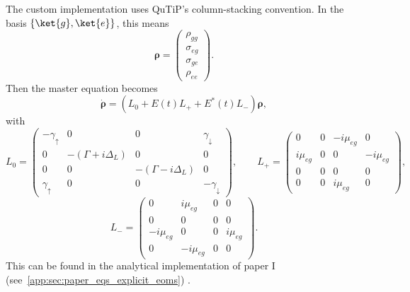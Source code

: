 The custom implementation uses QuTiP's column-stacking convention.
In the basis \(\{\ket{g}, \ket{e}\}\), this means
\begin{equation}
	\boldsymbol{\rho} =
	\begin{pmatrix}
		\rho_{gg} \\
		\sigma_{eg} \\
		\sigma_{ge} \\
		\rho_{ee}
	\end{pmatrix}.
	\label{eq:oqs_DensityMatrixVector}
\end{equation}
Then the master equation becomes
\begin{equation}
	\dot{\boldsymbol{\rho}} = \left(L_0 + E(t)L_+ + E^*(t)L_-\right)\boldsymbol{\rho},
	\label{eq:LiouvillianMatrixForm}
\end{equation}
with
\begin{equation}
	L_0 =
	\begin{pmatrix}
		-\gamma_{\uparrow} & 0 & 0 & \gamma_{\downarrow} \\
		0 & -(\Gamma + i\Delta_L) & 0 & 0 \\
		0 & 0 & -(\Gamma - i\Delta_L) & 0 \\
		\gamma_{\uparrow} & 0 & 0 & -\gamma_{\downarrow}
	\end{pmatrix},
	\qquad
	L_+ =
	\begin{pmatrix}
		0 & 0 & -i\mu_{eg} & 0 \\
		i\mu_{eg} & 0 & 0 & -i\mu_{eg} \\
		0 & 0 & 0 & 0 \\
		0 & 0 & i\mu_{eg} & 0
	\end{pmatrix},
\end{equation}
\begin{equation}
	L_- =
	\begin{pmatrix}
		0 & i\mu_{eg} & 0 & 0 \\
		0 & 0 & 0 & 0 \\
		-i\mu_{eg} & 0 & 0 & i\mu_{eg} \\
		0 & -i\mu_{eg} & 0 & 0
	\end{pmatrix}.
\end{equation}
This can be found in the analytical implementation of paper I (see~\autoref{app:sec:paper_eqs_explicit_eoms}) \cite{mancaletal2006twodimensionalopticalthreepulse}.

